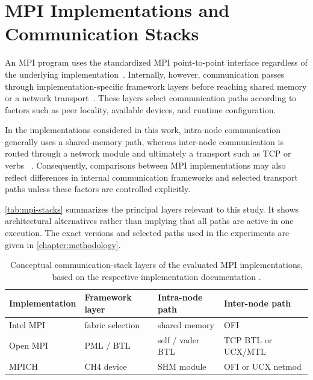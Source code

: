 \section{MPI Implementations and Communication Stacks}

An MPI program uses the standardized MPI point-to-point interface regardless
of the underlying implementation~\cite{mpi50}. Internally, however, communication
passes through implementation-specific framework layers before reaching
shared memory or a network transport~\cite{intelFabricsControl,openmpiNetworkArchitecture,mpichDeveloperGuide}.
These layers select communication paths according to factors such as peer locality,
available devices, and runtime configuration.

In the implementations considered in this work, intra-node communication
generally uses a shared-memory path, whereas inter-node communication is routed
through a network module and ultimately a transport such as TCP or verbs
~\cite{intelFabricsControl,openmpiNetworkArchitecture,mpichDeveloperGuide}.
Consequently, comparisons between MPI implementations may also reflect
differences in internal communication frameworks and selected transport paths
unless these factors are controlled explicitly.

\autoref{tab:mpi-stacks} summarizes the principal layers relevant to
this study. It shows architectural alternatives rather than implying that all
paths are active in one execution. The exact versions and selected paths used
in the experiments are given in \autoref{chapter:methodology}.

\begin{table}[htbp]
    \centering
    \caption[Conceptual communication-stack layers of the evaluated MPI implementations.]{Conceptual communication-stack layers of the evaluated MPI
    implementations, based on the respective implementation documentation
    \cite{intelOfiProviders,openmpiNetworkArchitecture,mpichDeveloperGuide}.}
    \label{tab:mpi-stacks}
    \begin{tabular}{llll}
        \toprule
        Implementation & Framework layer & Intra-node path & Inter-node path \\
        \midrule
        Intel MPI & fabric selection & shared memory & OFI \\
        Open MPI & PML / BTL & self / vader BTL & TCP BTL or UCX/MTL \\
        MPICH & CH4 device & SHM module & OFI or UCX netmod \\
        \bottomrule
    \end{tabular}

    \vspace{0.3em}
\end{table}
